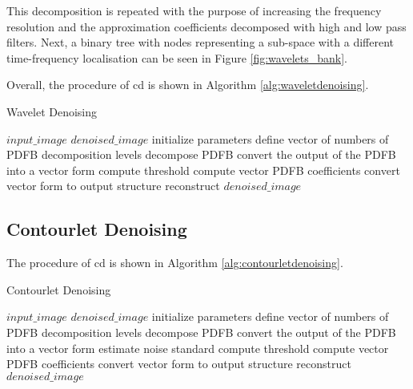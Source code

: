 This decomposition is repeated with the purpose of increasing the frequency resolution and the approximation coefficients decomposed with high and low pass filters. Next, a binary tree with nodes representing a sub-space with a different time-frequency localisation can be seen in Figure \ref{fig:wavelets_bank}.


Overall, the procedure of \gls{cd} is shown in Algorithm \ref{alg:waveletdenoising}.


\begin{algorithm}
	\caption{Wavelet Denoising}\label{alg:waveletdenoising}
	\begin{algorithmic}[1]
		\Require $input\_image$
		\Ensure $denoised\_image$
			\State initialize parameters
			\State define vector of numbers of PDFB decomposition levels  
			\State decompose PDFB 
			\State convert the output of the PDFB into a vector form 
			\State compute threshold 
			\State compute vector PDFB coefficients 
			\State convert vector form to output structure 
			\State reconstruct $denoised\_image$ 
		\EndProcedure
	\end{algorithmic}
\end{algorithm}


\subsection{Contourlet Denoising}
The procedure of \gls{cd} is shown in Algorithm \ref{alg:contourletdenoising}.


\begin{algorithm}
	\caption{Contourlet Denoising}\label{alg:contourletdenoising}
	\begin{algorithmic}[1]
		\Require $input\_image$
		\Ensure $denoised\_image$
		\State initialize parameters
		\State define vector of numbers of PDFB decomposition levels  
		\State decompose PDFB 
		\State convert the output of the PDFB into a vector form 
		\State estimate noise standard 
		\State compute threshold 
		\State compute vector PDFB coefficients  
		\State convert vector form to output structure 
		\State reconstruct $denoised\_image$ 
		\EndProcedure
	\end{algorithmic}
\end{algorithm}


